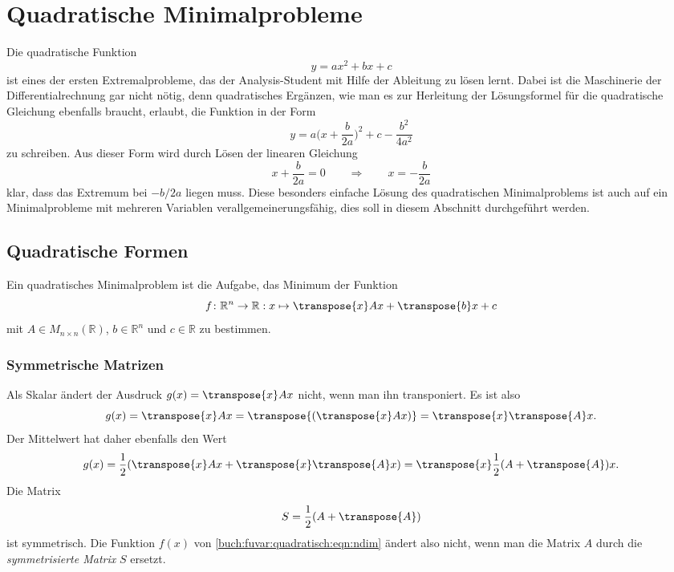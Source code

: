 %
%
%
\section{Quadratische Minimalprobleme
\label{buch:fuvar:section:quadratisch}}
Die quadratische Funktion
\begin{equation}
y
=
ax^2 + bx + c
\label{buch:fuvar:quadratisch:eqn:1dim}
\end{equation}
ist eines der ersten Extremalprobleme, das der Analysis-Student mit
Hilfe der Ableitung zu lösen lernt.
Dabei ist die Maschinerie der Differentialrechnung gar nicht nötig,
denn quadratisches Ergänzen, wie man es zur Herleitung der Lösungsformel
für die quadratische Gleichung ebenfalls braucht, erlaubt, die Funktion
in der Form
\[
y
=
a\biggl(x+\frac{b}{2a}\biggr)^2
+c
-\frac{b^2}{4a^2}
\]
zu schreiben.
Aus dieser Form wird durch Lösen der linearen Gleichung
\[
x+\frac{b}{2a} = 0
\qquad\Rightarrow\qquad
x = -\frac{b}{2a}
\]
klar, dass das Extremum bei $-b/2a$ liegen muss.
Diese besonders einfache Lösung des quadratischen Minimalproblems
ist auch auf ein Minimalprobleme mit mehreren Variablen
verallgemeinerungsfähig, dies soll in diesem Abschnitt durchgeführt
werden.

%
%
\subsection{Quadratische Formen}
Ein quadratisches Minimalproblem ist die Aufgabe, das Minimum der
Funktion
\begin{equation}
f
\colon
\mathbb{R}^n \to \mathbb{R}
:
x\mapsto \transpose{x} A x + \transpose{b} x + c
\label{buch:fuvar:quadratisch:eqn:ndim}
\end{equation}
mit $A\in M_{n\times n}(\mathbb{R})$, $b\in\mathbb{R}^n$ und $c\in\mathbb{R}$
zu bestimmen.

%
%
\subsubsection{Symmetrische Matrizen}
Als Skalar ändert der Ausdruck $g(x) = \transpose{x}Ax$  nicht, wenn man ihn
transponiert.
Es ist also
\[
g(x)
=
\transpose{x}Ax
=
\transpose{(\transpose{x}Ax)}
=
\transpose{x}\transpose{A}x.
\]
Der Mittelwert hat daher ebenfalls den Wert
\[
g(x)
=
\frac12(\transpose{x}Ax+\transpose{x}\transpose{A}x)
=
\transpose{x}\frac12(A+\transpose{A})x.
\]
Die Matrix
\[
S=\frac12(A+\transpose{A})
\]
ist symmetrisch.
Die Funktion $f(x)$ von \eqref{buch:fuvar:quadratisch:eqn:ndim}
ändert also nicht, wenn man die Matrix $A$ durch die {\em symmetrisierte
Matrix} $S$ ersetzt.

